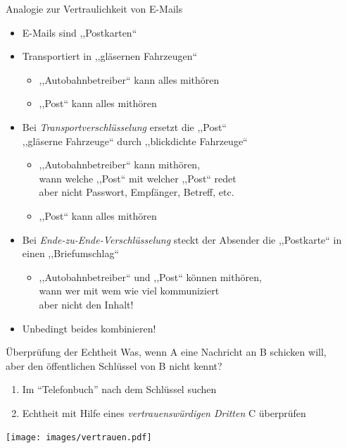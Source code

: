   \begin{frame}{Analogie zur Vertraulichkeit von E-Mails}
    \begin{itemize}
      \item E-Mails sind ,,Postkarten``
      \item Transportiert in ,,gläsernen Fahrzeugen``
      \begin{itemize}
        \item ,,Autobahnbetreiber`` kann alles mithören
        \item ,,Post`` kann alles mithören
      \end{itemize}
      \item Bei \emph{Transportverschlüsselung} ersetzt die ,,Post``\\ ,,gläserne Fahrzeuge`` durch ,,blickdichte Fahrzeuge``
      \begin{itemize}
        \item ,,Autobahnbetreiber`` kann mithören,\\ wann welche ,,Post`` mit welcher ,,Post`` redet\\ aber nicht Passwort, Empfänger, Betreff, etc.
        \item ,,Post`` kann alles mithören
      \end{itemize}
      \item Bei \emph{Ende-zu-Ende-Verschlüsselung} steckt der Absender die ,,Postkarte`` in einen ,,Briefumschlag``
      \begin{itemize}
        \item ,,Autobahnbetreiber`` und ,,Post`` können mithören,\\ wann wer mit wem wie viel kommuniziert\\ aber nicht den Inhalt!
      \end{itemize}
      \item Unbedingt beides kombinieren!
    \end{itemize}
  \end{frame}

  \begin{frame}{Überprüfung der Echtheit}
  Was, wenn A eine Nachricht an B schicken will,\\ aber den öffentlichen Schlüssel von B nicht kennt?\\
  \begin{enumerate}
    \item Im ``Telefonbuch'' nach dem Schlüssel suchen
    \item Echtheit mit Hilfe eines \emph{vertrauenswürdigen Dritten} C überprüfen
  \end{enumerate}
  \begin{center}
    \texttt{[image: images/vertrauen.pdf]}
  \end{center}
  \end{frame}

